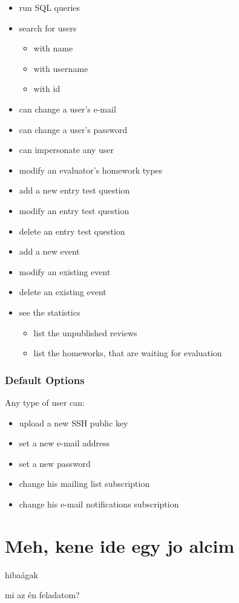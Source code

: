 \begin{itemize}
	\item run SQL queries
	\item search for users
	\begin{itemize}
		\item with name
		\item with username
		\item with id
	\end{itemize}
	\item can change a user's e-mail
	\item can change a user's password
	\item can impersonate any user
	\item modify an evaluator's homework types
	\item add a new entry test question
	\item modify an entry test question
	\item delete an entry test question
	\item add a new event
	\item modify an existing event
	\item delete an existing event
	\item see the statistics
	\begin{itemize}
		\item list the unpublished reviews
		\item list the homeworks, that are waiting for evaluation
	\end{itemize}
\end{itemize}

\subsubsection{Default Options}

Any type of user can:

\begin{itemize}
	\item upload a new SSH public key
	\item set a new e-mail address
	\item set a new password
	\item change his mailing list subscription
	\item change his e-mail notifications subscription
\end{itemize}

\section{Meh, kene ide egy jo alcim}


hibaágak


mi az én feladatom?
